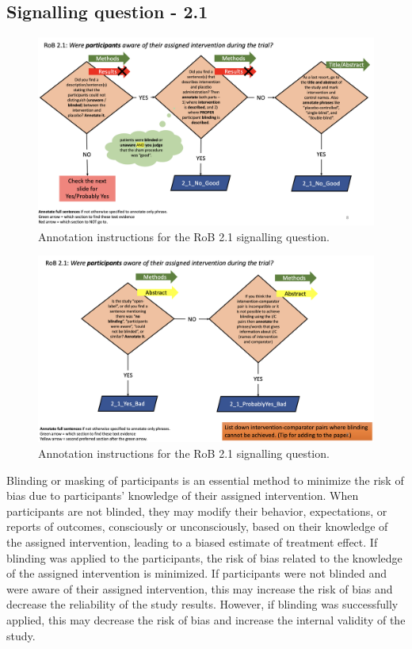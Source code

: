 \documentclass[sn-mathphys,Numbered]{sn-jnl}%
\begin{document}
\subsection*{Signalling question - 2.1}
\label{subsec:2_1}
%

%

\begin{figure}[hbt]
    \centering
    \includegraphics[width=\textwidth]{figures/2_1.png}
    \caption{Annotation instructions for the RoB 2.1 signalling question.}
    \label{fig:2_1}
\end{figure}
\begin{figure}[hbt]
    \centering
    \includegraphics[width=\textwidth]{figures/2_1_1.png}
    \caption{Annotation instructions for the RoB 2.1 signalling question.}
    \label{fig:2_1_1}
\end{figure}
%
Blinding or masking of participants is an essential method to minimize the risk of bias due to participants' knowledge of their assigned intervention.
When participants are not blinded, they may modify their behavior, expectations, or reports of outcomes, consciously or unconsciously, based on their knowledge of the assigned intervention, leading to a biased estimate of treatment effect.
If blinding was applied to the participants, the risk of bias related to the knowledge of the assigned intervention is minimized.
If participants were not blinded and were aware of their assigned intervention, this may increase the risk of bias and decrease the reliability of the study results.
However, if blinding was successfully applied, this may decrease the risk of bias and increase the internal validity of the study.
\end{document}
